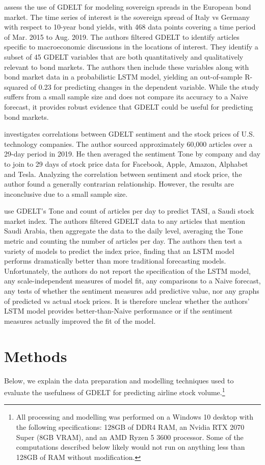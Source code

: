 \documentclass[12pt]{article}
\begin{document}
\textcite{consoli2021information} assess the use of GDELT for modeling sovereign spreads in the European bond market. The time series of interest is the sovereign spread of Italy vs Germany with respect to 10-year bond yields, with 468 data points covering a time period of Mar. 2015 to Aug. 2019. The authors filtered GDELT to identify articles specific to macroeconomic discussions in the locations of interest. They identify a subset of 45 GDELT variables that are both quantitatively and qualitatively relevant to bond markets. The authors then include these variables along with bond market data in a probabilistic LSTM model, yielding an out-of-sample R-squared of 0.23 for predicting changes in the dependent variable. While the study suffers from a small sample size and does not compare its accuracy to a Naive forecast, it provides robust evidence that GDELT could be useful for predicting bond markets.

\textcite{jakel2019using} investigates correlations between GDELT sentiment and the stock prices of U.S. technology companies. The author sourced approximately 60,000 articles over a 29-day period in 2019. He then averaged the sentiment Tone by company and day to join to 29 days of stock price data for Facebook, Apple, Amazon, Alphabet and Tesla. Analyzing the correlation between sentiment and stock price, the author found a generally contrarian relationship. However, the results are inconclusive due to a small sample size.

\textcite{alamro2019predicting} use GDELT's Tone and count of articles per day to predict TASI, a Saudi stock market index. The authors filtered GDELT data to any articles that mention Saudi Arabia, then aggregate the data to the daily level, averaging the Tone metric and counting the number of articles per day. The authors then test a variety of models to predict the index price, finding that an LSTM model performs dramatically better than more traditional forecasting models. Unfortunately, the authors do not report the specification of the LSTM model, any scale-independent measures of model fit, any comparisons to a Naive forecast, any tests of whether the sentiment measures add predictive value, nor any graphs of predicted vs actual stock prices. It is therefore unclear whether the authors' LSTM model provides better-than-Naive performance or if the sentiment measures actually improved the fit of the model.

\section{Methods}
Below, we explain the data preparation and modelling techniques used to evaluate the usefulness of GDELT for predicting airline stock volume.\footnote{All processing and modelling was performed on a Windows 10 desktop with the following specifications: 128GB of DDR4 RAM, an Nvidia RTX 2070 Super (8GB VRAM), and an AMD Ryzen 5 3600 processor. Some of the computations described below likely would not run on anything less than 128GB of RAM without modification.}
\end{document}
